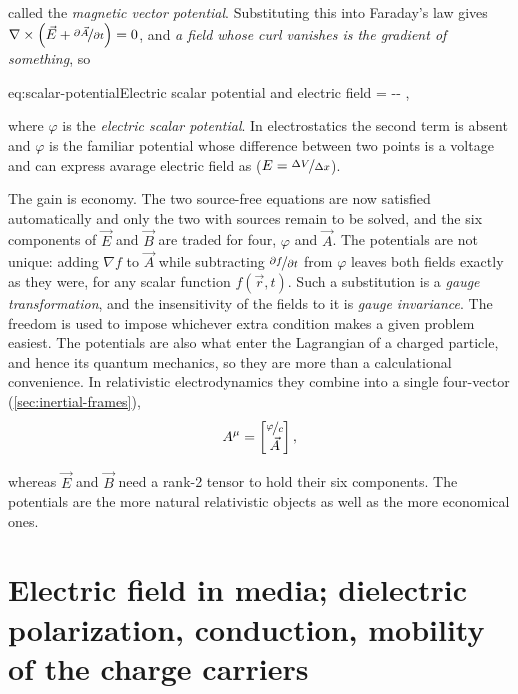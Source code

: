         called the \emph{magnetic vector potential}. Substituting this into Faraday's law gives $\nabla\times\left(\vec{E} + \nicefrac{\partial\vec{A}}{\partial t}\right) = 0$, and \emph{a field whose curl vanishes is the gradient of something}, so

        \begin{keyeq}{eq:scalar-potential}{Electric scalar potential and electric field}
             = -\nabla\varphi - ,
        \end{keyeq}

        where $\varphi$ is the \emph{electric scalar potential}. In electrostatics the second term is absent and $\varphi$ is the familiar potential whose difference between two points is a voltage and can express avarage electric field as ($E=\nicefrac{\Delta V}{\Delta x}$).

       The gain is economy. The two source-free equations are now satisfied automatically and only the two with sources remain to be solved, and the six components of $\vec{E}$ and $\vec{B}$ are traded for four, $\varphi$ and $\vec{A}$. The potentials are not unique: adding $\nabla f$ to $\vec{A}$ while subtracting $\nicefrac{\partial f}{\partial t}$ from $\varphi$ leaves both fields exactly as they were, for any scalar function $f(\vec{r},t)$. Such a substitution is a \emph{gauge transformation}, and the insensitivity of the fields to it is \emph{gauge invariance}. The freedom is used to impose whichever extra condition makes a given problem easiest. The potentials are also what enter the Lagrangian of a charged particle, and hence its quantum mechanics, so they are more than a calculational convenience. In relativistic electrodynamics they combine into a single four-vector (\cref{sec:inertial-frames}),
        \begin{equation*}
            A^{\mu} =
            \begin{bmatrix}
                \nicefrac{\varphi}{c} \\ \vec{A}
            \end{bmatrix},
        \end{equation*}

        whereas $\vec{E}$ and $\vec{B}$ need a rank-2 tensor to hold their six components. The potentials are the more natural relativistic objects as well as the more economical ones.
        
\section{Electric field in media; dielectric polarization, conduction, mobility of the charge carriers}
\label{sec:electric-field}

